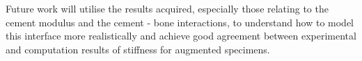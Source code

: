 Future work will utilise the results acquired, especially those relating to the
cement modulus and the cement - bone interactions, to understand how to model
this interface more realistically and achieve good agreement between
experimental and computation results of stiffness for augmented specimens.


